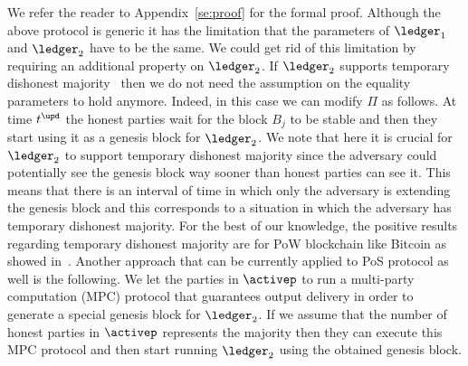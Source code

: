We refer the reader to Appendix~\ref{se:proof} for the formal proof.
Although the above protocol is generic it has the limitation that the parameters
of $\ledger_1$ and $\ledger_2$ have to be the same. We could get rid of this limitation by requiring an additional property on $\ledger_2$.
If $\ledger_2$ supports temporary dishonest majority~\cite{DBLP:journals/corr/abs-1908-00427} then we do not need the assumption on the equality parameters to 
hold anymore.
Indeed, in this case we can modify $\Pi$ as follows. At time $t^\upd$ the honest parties wait for the block $B_j$ to be stable and then they start using it as a genesis 
block for $\ledger_2$.  We note that here it is crucial for $\ledger_2$ to support temporary dishonest majority since the adversary
could potentially see the genesis block way sooner than honest parties can see it. This means that there is an interval of time in which only the adversary is extending 
the genesis block and this corresponds to a situation in which the adversary has temporary dishonest majority.
For the best of our knowledge, the positive results regarding temporary dishonest majority are for PoW blockchain like Bitcoin as showed in~\cite{DBLP:journals/corr/abs-1908-00427}.
Another approach that can be currently applied to PoS protocol as well is the following. We let the parties in $\activep$ to run a multi-party computation (MPC) protocol
that guarantees output delivery in order to generate a special genesis block for $\ledger_2$. If we assume that the number of honest parties in $\activep$
represents the majority then they can execute this MPC protocol and then start running $\ledger_2$ using the obtained genesis block.







